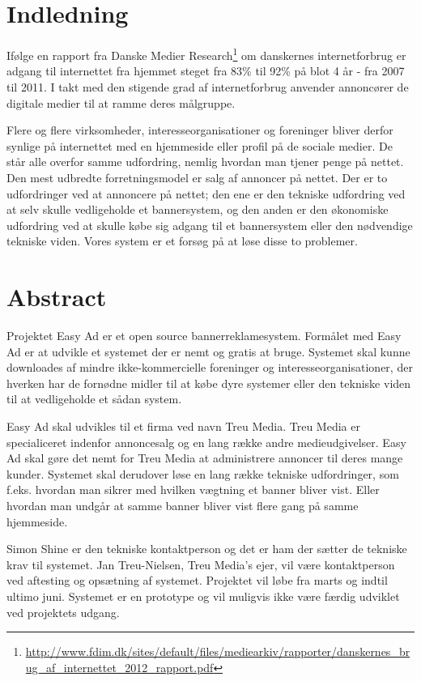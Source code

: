\documentclass[a4paper,12pt]{article}
\begin{document}
\section{Indledning}
Ifølge en rapport fra Danske Medier Research\footnote{\url{ http://www.fdim.dk/sites/default/files/mediearkiv/rapporter/danskernes\_brug\_af\_internettet\_2012\_rapport.pdf}} om danskernes internetforbrug er adgang til internettet fra hjemmet steget fra 83\% til 92\% på blot 4 år - fra 2007 til 2011. I takt med den stigende grad af internetforbrug anvender annoncører de digitale medier til at ramme deres målgruppe.

Flere og flere virksomheder, interesseorganisationer og foreninger bliver derfor synlige på internettet med en hjemmeside eller profil på de sociale medier. De står alle overfor samme udfordring, nemlig hvordan man tjener penge på nettet. Den mest udbredte forretningsmodel er salg af annoncer på nettet. Der er to udfordringer ved at annoncere på nettet; den ene er den tekniske udfordring ved at selv skulle vedligeholde et bannersystem, og den anden er den økonomiske udfordring ved at skulle købe sig adgang til et bannersystem eller den nødvendige tekniske viden. Vores system er et forsøg på at løse disse to problemer.

\section{Abstract}

Projektet Easy Ad er et open source bannerreklamesystem. Formålet med Easy Ad er at udvikle et systemet der er nemt og gratis at bruge. Systemet skal kunne downloades af mindre ikke-kommercielle foreninger og interesseorganisationer, der hverken har de fornødne midler til at købe dyre systemer eller den tekniske viden til at vedligeholde et sådan system.

Easy Ad skal udvikles til et firma ved navn Treu Media. Treu Media er specialiceret indenfor annoncesalg og en lang række andre medieudgivelser. Easy Ad skal gøre det nemt for Treu Media at administrere annoncer til deres mange kunder. Systemet skal derudover løse en lang række tekniske udfordringer, som f.eks. hvordan man sikrer med hvilken vægtning et banner bliver vist. Eller hvordan man undgår at samme banner bliver vist flere gang på samme hjemmeside.

Simon Shine er den tekniske kontaktperson og det er ham der sætter de tekniske krav til systemet. Jan Treu-Nielsen, Treu Media's ejer, vil være kontaktperson ved aftesting og opsætning af systemet. Projektet vil løbe fra marts og indtil ultimo juni. Systemet er en prototype og vil muligvis ikke være færdig udviklet ved projektets udgang. 
\end{document}
